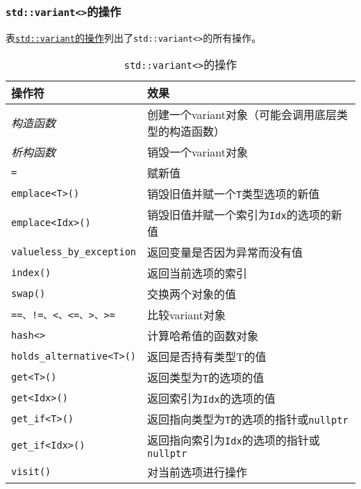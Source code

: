 \subsubsection{\texttt{std::variant<>}的操作}
表\hyperref[t16.1]{\texttt{std::variant}的操作}列出了\texttt{std::variant<>}的所有操作。
\begin{table}[ht]
    \begin{tabular}{l|p{}}
        \hline
        \textbf{操作符}                      & \textbf{效果}                                \\
        \hline
        \emph{构造函数}                       & 创建一个variant对象（可能会调用底层类型的构造函数）              \\
        \emph{析构函数}                       & 销毁一个variant对象                              \\
        \texttt{=}                        & 赋新值                                        \\
        \texttt{emplace<T>()}             & 销毁旧值并赋一个\texttt{T}类型选项的新值                  \\
        \texttt{emplace<Idx>()}           & 销毁旧值并赋一个索引为\texttt{Idx}的选项的新值              \\
        \texttt{valueless\_by\_exception} & 返回变量是否因为异常而没有值                             \\
        \texttt{index()}                  & 返回当前选项的索引                                  \\
        \texttt{swap()}                   & 交换两个对象的值                                   \\
        \texttt{==、!=、<、<=、>、>=}          & 比较variant对象                                \\
        \texttt{hash<>}                   & 计算哈希值的函数对象                                 \\
        \texttt{holds\_alternative<T>()}  & 返回是否持有类型T的值                                \\
        \texttt{get<T>()}                 & 返回类型为\texttt{T}的选项的值                       \\
        \texttt{get<Idx>()}               & 返回索引为\texttt{Idx}的选项的值                     \\
        \texttt{get\_if<T>()}             & 返回指向类型为\texttt{T}的选项的指针或\texttt{nullptr}   \\
        \texttt{get\_if<Idx>()}           & 返回指向索引为\texttt{Idx}的选项的指针或\texttt{nullptr} \\
        \texttt{visit()}                  & 对当前选项进行操作                                  \\
        \hline
    \end{tabular}
    \caption{\texttt{std::variant<>}的操作}
    \label{t16.1}
\end{table}

